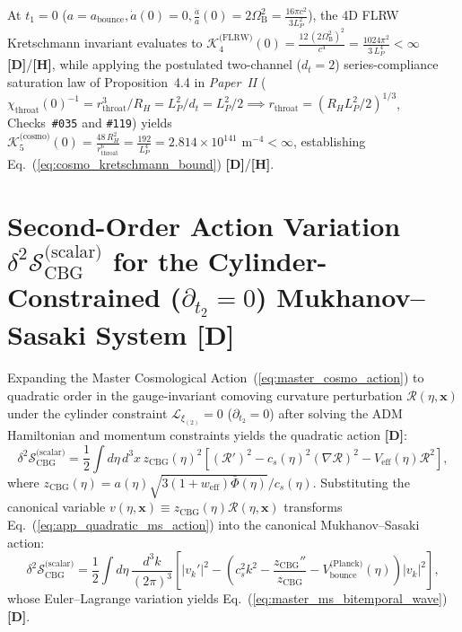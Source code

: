 \documentclass[11pt,a4paper]{article}
\newcommand{\catD}{\textbf{\textcolor{blue!75!black}{[D]}}}
\newcommand{\catH}{\textbf{\textcolor{orange!85!black}{[H]}}}
\theoremstyle{plain}
\theoremstyle{definition}
\theoremstyle{remark}
\numberwithin{equation}{section}
\begin{document}
At $t_1 = 0$ ($a = a_{\text{bounce}}, \dot{a}(0) = 0, \frac{\ddot{a}}{a}(0) = 2\Omega_{\text{B}}^2 = \frac{16\pi c^2}{3 L_P^2}$), the 4D FLRW Kretschmann invariant evaluates to $\mathcal{K}_4^{\text{(FLRW)}}(0) = \frac{12\,(2\Omega_{\text{B}}^2)^2}{c^4} = \frac{1024\pi^2}{3\,L_P^4} < \infty$ \catD/\catH, while applying the postulated two-channel ($d_t = 2$) series-compliance saturation law of Proposition~4.4 in \textit{Paper~II} \cite{jimenez2026b} ($\chi_{\text{throat}}(0)^{-1} = r_{\text{throat}}^3/R_H = L_P^2/d_t = L_P^2/2 \implies r_{\text{throat}} = (R_H L_P^2/2)^{1/3}$, Checks~\texttt{\#035} and \texttt{\#119}) yields $\mathcal{K}_5^{\text{(cosmo)}}(0) = \frac{48\,R_H^2}{r_{\text{throat}}^6} = \frac{192}{L_P^4} = 2.814 \times 10^{141}\text{ m}^{-4} < \infty$, establishing Eq.~(\ref{eq:cosmo_kretschmann_bound}) \catD/\catH.

\section{\texorpdfstring{Second-Order Action Variation $\delta^2 \mathcal{S}_{\text{CBG}}^{\text{(scalar)}}$ for the Cylinder-Constrained ($\partial_{t_2} = 0$) Mukhanov--Sasaki System \catD}{Second-Order Action Variation for the Cylinder-Constrained Mukhanov-Sasaki System}}
\label{app:ms_second_order_action}

Expanding the Master Cosmological Action~(\ref{eq:master_cosmo_action}) to quadratic order in the gauge-invariant comoving curvature perturbation $\mathcal{R}(\eta, \mathbf{x})$ under the cylinder constraint $\mathcal{L}_{\xi_{(2)}} = 0$ ($\partial_{t_2} = 0$) after solving the ADM Hamiltonian and momentum constraints yields the quadratic action \catD:
\begin{equation}
\delta^2 \mathcal{S}_{\text{CBG}}^{\text{(scalar)}} = \frac{1}{2} \int d\eta \, d^3x \, z_{\text{CBG}}(\eta)^2 \left[ \left(\mathcal{R}'\right)^2 - c_s(\eta)^2 \left(\nabla\mathcal{R}\right)^2 - V_{\text{eff}}(\eta)\mathcal{R}^2 \right],
\label{eq:app_quadratic_ms_action}
\end{equation}
where $z_{\text{CBG}}(\eta) = a(\eta)\sqrt{3(1+w_{\text{eff}})\bar{\Phi}(\eta)} / c_s(\eta)$. Substituting the canonical variable $v(\eta, \mathbf{x}) \equiv z_{\text{CBG}}(\eta)\mathcal{R}(\eta, \mathbf{x})$ transforms Eq.~(\ref{eq:app_quadratic_ms_action}) into the canonical Mukhanov--Sasaki action:
\begin{equation}
\delta^2 \mathcal{S}_{\text{CBG}}^{\text{(scalar)}} = \frac{1}{2} \int d\eta \, \frac{d^3k}{(2\pi)^3} \left[ \left\lvert v_k'\right\rvert^2 - \left( c_s^2 k^2 - \frac{z_{\text{CBG}}''}{z_{\text{CBG}}} - V_{\text{bounce}}^{\text{(Planck)}}(\eta) \right) \left\lvert v_k\right\rvert^2 \right],
\label{eq:app_canonical_v_action}
\end{equation}
whose Euler--Lagrange variation yields Eq.~(\ref{eq:master_ms_bitemporal_wave}) \catD.
\end{document}
